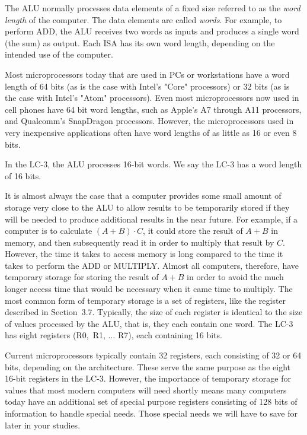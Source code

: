 \documentclass{patt}
\begin{document}
The ALU normally processes data elements of a fixed size referred to as the
{\em word length} of the computer.  The data elements are called {\em words}.
For example, to perform ADD, the ALU receives two words as inputs and produces
a single word (the sum) as output.
Each ISA has its own word length, depending on the intended use of 
the computer.

Most microprocessors today that are used in PCs or workstations have a word
length of 64 bits (as is the case with Intel's "Core" processors) or 32
bits (as is the case with Intel's "Atom" processors). Even most 
microprocessors now used in cell phones have 64 bit word lengths, such as 
Apple's A7 through A11 processors, and Qualcomm's SnapDragon processors.
However, the microprocessors used in very inexpensive applications often
have word lengths of as little as 16 or even 8 bits.

In the LC-3, the ALU processes 16-bit words.  We say the LC-3 has a
word length of 16 bits.  

It is almost always the case that a computer provides some small amount of
storage very close to the ALU to allow results to be temporarily stored if
they will be needed to produce additional results in the near future.  
For example,
if a computer is to calculate $(A+B)\cdot C$, it could store the result of
$A+B$ in memory, and then subsequently read it in order to multiply that
result by $C$.  However, the time it takes to access memory is long compared
to the time it takes to perform the ADD or MULTIPLY.  Almost all computers,
therefore, have temporary storage for storing the result of $A+B$ in order
to avoid the much longer access time that would be necessary when
it came time to multiply.  The most common form of temporary storage is a set
of registers, like the register described in Section~3.7. Typically, the
size of each register is identical to the size of values processed by the
ALU, that is, they each contain one word.  The LC-3 has eight registers
(R0,~R1, $\ldots$ R7), each containing 16 bits. 

Current microprocessors typically contain 32 registers, each consisting of
32 or 64 bits, depending on the architecture.  These serve the same purpose 
as the eight 16-bit registers in the LC-3.  However, the importance of 
temporary storage for values that most modern computers will need shortly 
means many computers today have an additional set of special purpose 
registers consisting of 128 bits of information to handle special needs.
Those special needs we will have to save for later in your studies. 
\end{document}
